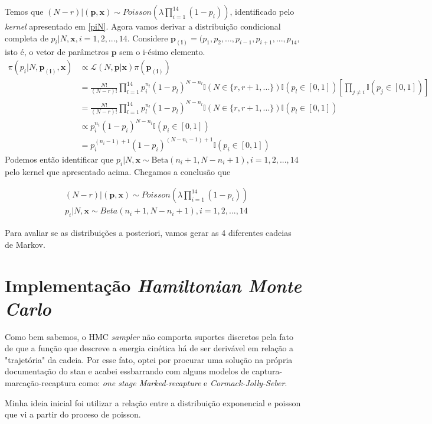 \documentclass[a4paper,12pt,twoside]{article}
\begin{document}
Temos que $(N-r)|(\mathbf{p,x})\sim Poisson(\lambda\prod_{i=1}^{14}(1-p_i))$, identificado pelo \textit{kernel} apresentado em \ref{piN}.
\newpage
\restoregeometry
Agora vamos derivar a distribuição condicional completa de $p_i|N,\mathbf{x}, i=1,2,...,14$. Considere $\mathbf{p_{(i)}}=(p_1,p_2,...,p_{i-1},p_{i+1},...,p_{14}$, isto é, o vetor de parâmetros $\mathbf{p}$ sem o i-ésimo elemento.
\begin{align*}
\pi(p_i|N,\mathbf{p_{(i)},x})&\propto \mathcal{L}(N,\mathbf{p}|\mathbf{x}) \pi(\mathbf{p_{(i)}})\\
& = \frac{N!}{(N-r)!}\prod_{l=1}^{14}p_{i}^{n_l}(1-p_l)^{N-n_l}\mathds{I}(N \in \{r,r+1,...\})\mathds{I}(p_l \in [0,1])\left[\prod_{j\neq i}\mathds{I}(p_j \in [0,1])\right]\\
& = \frac{N!}{(N-r)!}\prod_{l=1}^{14}p_{l}^{n_l}(1-p_l)^{N-n_l}\mathds{I}(N \in \{r,r+1,...\})\mathds{I}(p_l \in [0,1])\\
& \propto p_i^{n_i}(1-p_i)^{N-n_i}\mathds{I}(p_i \in [0,1])\\
& = p_i^{(n_i-1)+1}(1-p_i)^{(N-n_i-1)+1}\mathds{I}(p_i \in [0,1])
\end{align*}
Podemos então identificar que $p_i|N,\mathbf{x} \sim \text{Beta}(n_i+1,N-n_i+1), i=1,2,...,14$ pelo kernel que apresentado acima. Chegamos a conclusão que 

\begin{align}
& (N-r)|(\mathbf{p,x})\sim Poisson(\lambda\prod_{i=1}^{14}(1-p_i))\\
& p_i|N,\mathbf{x} \sim Beta(n_i+1,N-n_i+1), i=1,2,...,14
\end{align}

Para avaliar se as distribuições a posteriori, vamos gerar as 4 diferentes cadeias de Markov.

\newpage
\section{Implementação \textit{Hamiltonian Monte Carlo}}
Como bem sabemos, o HMC \textit{sampler} não comporta suportes discretos pela fato de que a função que descreve a energia cinética há de ser derivável em relação a "trajetória" da cadeia. Por esse fato, optei por procurar uma solução na própria documentação do stan e acabei essbarrando com alguns modelos de captura-marcação-recaptura como: \textit{one stage Marked-recapture} e \textit{Cormack-Jolly-Seber}.

Minha ideia inicial foi utilizar a relação entre a distribuição exponencial e poisson que vi a partir do proceso de poisson.
\end{document}
